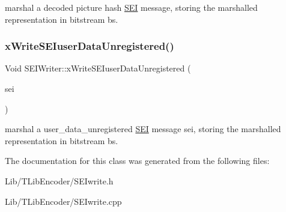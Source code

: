 marshal a decoded picture hash \hyperlink{class_s_e_i}{S\+EI} message, storing the marshalled representation in bitstream bs. \mbox{\label{class_s_e_i_writer_ac056ab733ae9179df6f066b477c09934}} 
\subsubsection{\texorpdfstring{x\+Write\+S\+E\+Iuser\+Data\+Unregistered()}{xWriteSEIuserDataUnregistered()}}
{\footnotesize\ttfamily Void S\+E\+I\+Writer\+::x\+Write\+S\+E\+Iuser\+Data\+Unregistered (\begin{DoxyParamCaption}\item[{const \hyperlink{class_s_e_iuser_data_unregistered}{S\+E\+Iuser\+Data\+Unregistered} \&}]{sei }\end{DoxyParamCaption})\hspace{0.3cm}{\ttfamily [protected]}}

marshal a user\+\_\+data\+\_\+unregistered \hyperlink{class_s_e_i}{S\+EI} message sei, storing the marshalled representation in bitstream bs. 

The documentation for this class was generated from the following files\+:\begin{DoxyCompactItemize}
\item 
Lib/\+T\+Lib\+Encoder/S\+E\+Iwrite.\+h\item 
Lib/\+T\+Lib\+Encoder/S\+E\+Iwrite.\+cpp\end{DoxyCompactItemize}

